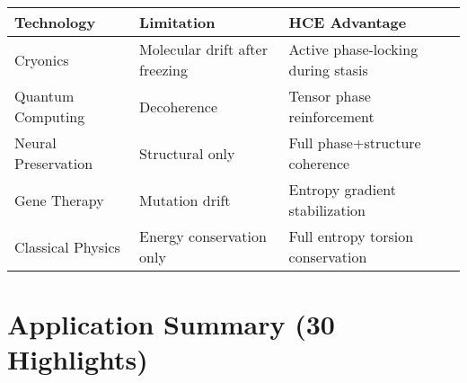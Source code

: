 \documentclass[12pt]{article}
\begin{document}
\begin{tabular}{|l|l|l|}
\hline
\textbf{Technology} & \textbf{Limitation} & \textbf{HCE Advantage} \\
\hline
Cryonics & Molecular drift after freezing & Active phase-locking during stasis \\
Quantum Computing & Decoherence & Tensor phase reinforcement \\
Neural Preservation & Structural only & Full phase+structure coherence \\
Gene Therapy & Mutation drift & Entropy gradient stabilization \\
Classical Physics & Energy conservation only & Full entropy torsion conservation \\
\hline
\end{tabular}

\section{Application Summary (30 Highlights)}
\end{document}
